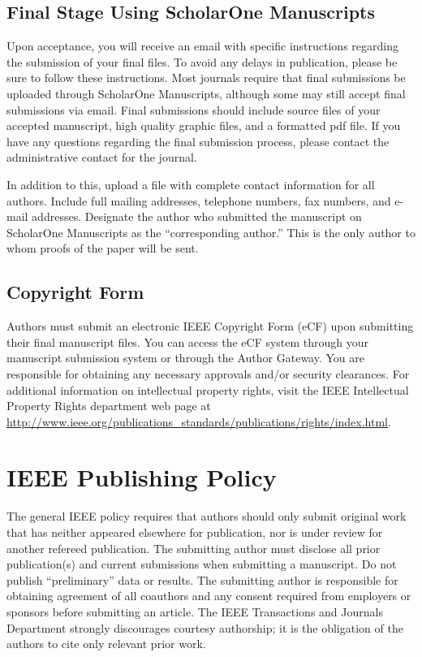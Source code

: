 \documentclass[journal,twoside,web]{ieeecolor}
\begin{document}
\subsection{Final Stage Using ScholarOne Manuscripts}
Upon acceptance, you will receive an email with specific instructions 
regarding the submission of your final files. To avoid any delays in 
publication, please be sure to follow these instructions. Most journals 
require that final submissions be uploaded through ScholarOne Manuscripts, 
although some may still accept final submissions via email. Final 
submissions should include source files of your accepted manuscript, high 
quality graphic files, and a formatted pdf file. If you have any questions 
regarding the final submission process, please contact the administrative 
contact for the journal. 

In addition to this, upload a file with complete contact information for all 
authors. Include full mailing addresses, telephone numbers, fax numbers, and 
e-mail addresses. Designate the author who submitted the manuscript on 
ScholarOne Manuscripts as the ``corresponding author.'' This is the only 
author to whom proofs of the paper will be sent. 

\subsection{Copyright Form}
Authors must submit an electronic IEEE Copyright Form (eCF) upon submitting 
their final manuscript files. You can access the eCF system through your 
manuscript submission system or through the Author Gateway. You are 
responsible for obtaining any necessary approvals and/or security 
clearances. For additional information on intellectual property rights, 
visit the IEEE Intellectual Property Rights department web page at 
\underline{http://www.ieee.org/publications\_standards/publications/rights/}\discretionary{}{}{}\underline{index.html}. 

\section{IEEE Publishing Policy}
The general IEEE policy requires that authors should only submit original 
work that has neither appeared elsewhere for publication, nor is under 
review for another refereed publication. The submitting author must disclose 
all prior publication(s) and current submissions when submitting a 
manuscript. Do not publish ``preliminary'' data or results. The submitting 
author is responsible for obtaining agreement of all coauthors and any 
consent required from employers or sponsors before submitting an article. 
The IEEE Transactions and Journals Department strongly discourages courtesy 
authorship; it is the obligation of the authors to cite only relevant prior 
work.
\end{document}
